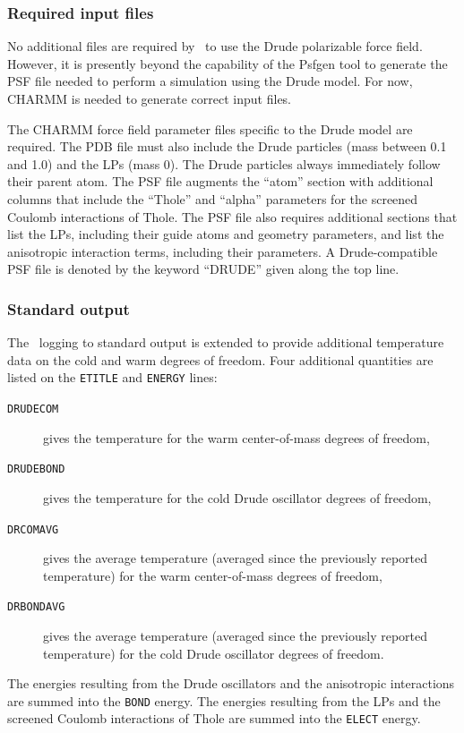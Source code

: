 \subsubsection{Required input files}

No additional files are required by \NAMD\ to use the 
Drude polarizable force field.  
However, it is presently beyond the capability of 
the Psfgen tool to generate the PSF file needed to perform 
a simulation using the Drude model.  
For now, CHARMM is needed to generate correct input files.  

The CHARMM force field parameter files
specific to the Drude model are required.  
The PDB file must also include 
the Drude particles (mass between 0.1 and 1.0) 
and the LPs (mass 0).  
The Drude particles always immediately follow their parent atom.  
The PSF file augments the ``atom'' section with 
additional columns that include the 
``Thole'' and ``alpha'' parameters for the screened Coulomb 
interactions of Thole.  
The PSF file also requires additional sections that 
list the LPs, including their guide atoms and geometry parameters, 
and list the anisotropic interaction terms, including their parameters.  
A Drude-compatible PSF file is denoted by the 
keyword ``DRUDE'' given along the top line.  


\subsubsection{Standard output}

The \NAMD\ logging to standard output is extended to provide additional 
temperature data on the cold and warm degrees of freedom.  
Four additional quantities are listed 
on the {\tt ETITLE} and {\tt ENERGY} lines:
\begin{description}
\item[{\tt DRUDECOM}] gives the temperature for the warm center-of-mass 
degrees of freedom,
\item[{\tt DRUDEBOND}] gives the temperature for the cold Drude oscillator 
degrees of freedom,
\item[{\tt DRCOMAVG}] gives the average temperature 
(averaged since the previously reported temperature) 
for the warm center-of-mass degrees of freedom, 
\item[{\tt DRBONDAVG}] gives the average temperature 
(averaged since the previously reported temperature) 
for the cold Drude oscillator degrees of freedom.
\end{description}
The energies resulting from the Drude oscillators and the 
anisotropic interactions are summed into the {\tt BOND} energy.  
The energies resulting from the LPs and the screened Coulomb 
interactions of Thole are summed into the {\tt ELECT} energy.  


